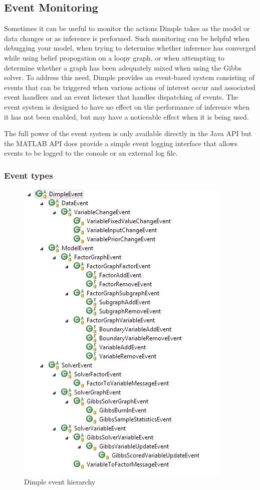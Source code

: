\subsection{Event Monitoring}

Sometimes it can be useful to monitor the actions Dimple takes as the model or data changes or as inference is performed. Such monitoring can be helpful when debugging your model, when trying to determine whether inference has converged while using belief propogation on a loopy graph, or when attempting to determine whether a graph has been adequately mixed when using the Gibbs solver. To address this need, Dimple provides an event-based system consisting of events that can be triggered when various actions of interest occur and associated event handlers and an event listener that handles dispatching of events. The event system is designed to have no effect on the performance of inference when it has not been enabled, but may have a noticeable effect when it is being used.

The full power of the event system is only available directly in the Java API but the MATLAB API does provide a simple event logging interface that allows events to be logged to the console or an external log file.

\subsubsection{Event types}

\begin{figure}[H]
  \centering
  \includegraphics{images/EventHierarchy.png}
  \caption{Dimple event hierarchy}
  \label{fig:EventHierarchy}
\end{figure}

